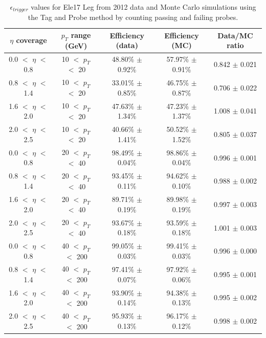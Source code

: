 \begin{table}[htb]
\caption{%
    $\epsilon_{trigger}$ values for Ele17 Leg from 2012 data and Monte Carlo simulations using the Tag and Probe method by counting passing and failing probes.
}
\begin{center}

    \begin{tabular}{ | c | c | c | c | c |}
      \hline
      $\eta$ coverage & $p_T$ range (GeV) & Efficiency (data) & Efficiency (MC) & Data/MC ratio \\ \hline \hline
      0.0 $<$ $\eta$ $<$ 0.8 & 10 $<$ $p_T$ $<$ 20 & 48.80\% $\pm$ 0.92\% & 57.97\% $\pm$ 0.91\% & 0.842 $\pm$ 0.021 \\ \hline
      0.8 $<$ $\eta$ $<$ 1.4 & 10 $<$ $p_T$ $<$ 20 & 33.01\% $\pm$ 0.85\% & 46.75\% $\pm$ 0.87\% & 0.706 $\pm$ 0.022 \\ \hline
      1.6 $<$ $\eta$ $<$ 2.0 & 10 $<$ $p_T$ $<$ 20 & 47.63\% $\pm$ 1.34\% & 47.23\% $\pm$ 1.37\% & 1.008 $\pm$ 0.041 \\ \hline
      2.0 $<$ $\eta$ $<$ 2.5 & 10 $<$ $p_T$ $<$ 20 & 40.66\% $\pm$ 1.41\% & 50.52\% $\pm$ 1.52\% & 0.805 $\pm$ 0.037 \\ \hline
      \hline
      0.0 $<$ $\eta$ $<$ 0.8 & 20 $<$ $p_T$ $<$ 40 & 98.49\% $\pm$ 0.04\% & 98.86\% $\pm$ 0.04\% & 0.996 $\pm$ 0.001 \\ \hline
      0.8 $<$ $\eta$ $<$ 1.4 & 20 $<$ $p_T$ $<$ 40 & 93.45\% $\pm$ 0.11\% & 94.62\% $\pm$ 0.10\% & 0.988 $\pm$ 0.002 \\ \hline
      1.6 $<$ $\eta$ $<$ 2.0 & 20 $<$ $p_T$ $<$ 40 & 89.71\% $\pm$ 0.19\% & 89.98\% $\pm$ 0.19\% & 0.997 $\pm$ 0.003 \\ \hline
      2.0 $<$ $\eta$ $<$ 2.5 & 20 $<$ $p_T$ $<$ 40 & 93.67\% $\pm$ 0.18\% & 93.59\% $\pm$ 0.18\% & 1.001 $\pm$ 0.003 \\ \hline
      \hline
      0.0 $<$ $\eta$ $<$ 0.8 & 40 $<$ $p_T$ $<$ 200 & 99.05\% $\pm$ 0.03\% & 99.41\% $\pm$ 0.03\% & 0.996 $\pm$ 0.000 \\ \hline
      0.8 $<$ $\eta$ $<$ 1.4 & 40 $<$ $p_T$ $<$ 200 & 97.41\% $\pm$ 0.07\% & 97.92\% $\pm$ 0.06\% & 0.995 $\pm$ 0.001 \\ \hline
      1.6 $<$ $\eta$ $<$ 2.0 & 40 $<$ $p_T$ $<$ 200 & 93.90\% $\pm$ 0.14\% & 94.38\% $\pm$ 0.13\% & 0.995 $\pm$ 0.002 \\ \hline
      2.0 $<$ $\eta$ $<$ 2.5 & 40 $<$ $p_T$ $<$ 200 & 95.93\% $\pm$ 0.13\% & 96.17\% $\pm$ 0.12\% & 0.998 $\pm$ 0.002 \\ \hline
    \end{tabular}
\end{center}
\label{tab:tagandprobe_17}
\end{table}



